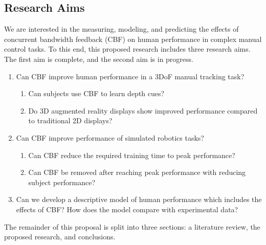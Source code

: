 \documentclass[float=false, crop=false]{standalone}
\begin{document}

\subsection{Research Aims}
We are interested in the measuring, modeling, and predicting the effects of concurrent bandwidth feedback (CBF) on human performance in complex manual control tasks.
To this end, this proposed research includes three research aims.
The first aim is complete, and the second aim is in progress.
\begin{enumerate}
\item Can CBF improve human performance in a 3DoF manual tracking task?
\begin{enumerate}
\item Can subjects use CBF to learn depth cues?
\item Do 3D augmented reality displays show improved performance compared to traditional 2D displays?
\end{enumerate}
\item Can CBF improve performance of simulated robotics tasks?
\begin{enumerate}
\item Can CBF reduce the required training time to peak performance?
\item Can CBF be removed after reaching peak performance with reducing subject performance?
\end{enumerate}
\item Can we develop a descriptive model of human performance which includes the effects of CBF? How does the model compare with experimental data?
\end{enumerate}

The remainder of this proposal is split into three sections: a literature review, the proposed research, and conclusions.
\end{document}
